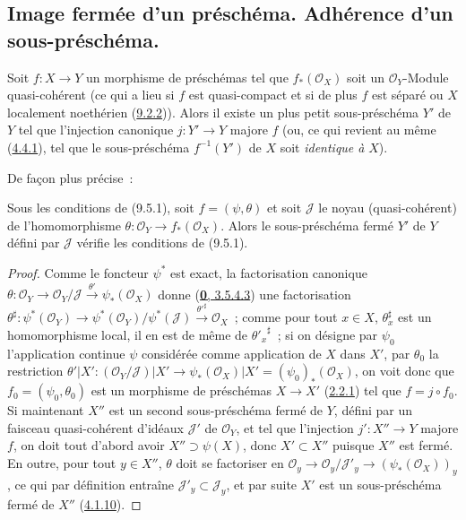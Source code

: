 \subsection{Image fermée d'un préschéma. Adhérence d'un sous-préschéma.}
\label{subsection:I.9.5-fr}

\begin{proposition}[9.5.1]
\label{I.9.5.1-fr}
Soit $f:X\to Y$ un morphisme de préschémas tel que $f_*(\mathscr{O}_X)$ soit
un $\mathscr{O}_Y$-Module quasi-cohérent (ce qui a lieu si $f$ est
quasi-compact et si de plus $f$ est séparé ou $X$ localement noethérien
(\hyperref[I.9.2.2-fr]{9.2.2})). Alors il existe un plus petit sous-préschéma
$Y'$ de $Y$ tel que l'injection canonique $j:Y'\to Y$ majore $f$ \textup{(ou, ce qui
revient au même (\hyperref[I.4.4.1-fr]{4.4.1}), tel que le sous-préschéma
$f^{-1}(Y')$ de $X$ soit \emph{identique à} $X$)}.
\end{proposition}

De façon plus précise~:

\begin{corollary}[9.5.2]
\label{I.9.5.2-fr}
Sous les conditions de (9.5.1), soit $f=(\psi,\theta)$ et soit $\mathscr{J}$
le noyau (quasi-cohérent) de l'homomorphisme
$\theta:\mathscr{O}_Y\to f_*(\mathscr{O}_X)$. Alors le sous-préschéma fermé
$Y'$ de $Y$ défini par $\mathscr{J}$ vérifie les conditions de (9.5.1).
\end{corollary}

\begin{proof}
Comme le foncteur $\psi^*$ est exact, la factorisation canonique
$\theta:\mathscr{O}_Y\to\mathscr{O}_Y/\mathscr{J}
\xrightarrow{\theta'}\psi_*(\mathscr{O}_X)$ donne
(\hyperref[0.3.5.4.3-fr]{\textbf{0}, 3.5.4.3}) une factorisation
$\theta^\sharp:\psi^*(\mathscr{O}_Y)
\to\psi^*(\mathscr{O}_Y)/\psi^*(\mathscr{J})
\xrightarrow{{\theta'}^\sharp}\mathscr{O}_X$~;
comme pour tout $x\in X$, $\theta_x^\sharp$ est un homomorphisme local, il
en est de même de ${\theta'_x}^\sharp$~; si on désigne par $\psi_0$
l'application continue $\psi$ considérée comme application de $X$ dans
$X'$, par $\theta_0$ la restriction
$\theta'|X':(\mathscr{O}_Y/\mathscr{J})|X'
\to\psi_*(\mathscr{O}_X)|X'=(\psi_0)_*(\mathscr{O}_X)$, on voit donc que
$f_0=(\psi_0,\theta_0)$ est un morphisme de préschémas $X\to X'$
(\hyperref[I.2.2.1-fr]{2.2.1}) tel que $f=j\circ f_0$. Si maintenant $X''$
est un second sous-préschéma fermé de $Y$, défini par un faisceau
quasi-cohérent d'idéaux $\mathscr{J}'$ de $\mathscr{O}_Y$, et tel que
l'injection $j':X''\to Y$ majore $f$, on doit tout d'abord avoir
$X''\supset\psi(X)$, donc $X'\subset X''$ puisque $X''$ est fermé. En outre,
pour tout $y\in X''$, $\theta$ doit se factoriser en
$\mathscr{O}_y\to\mathscr{O}_y/\mathscr{J}'_y
\to(\psi_*(\mathscr{O}_X))_y$, ce qui par définition entraîne
$\mathscr{J}'_y\subset\mathscr{J}_y$, et par suite $X'$ est un
sous-préschéma fermé de $X''$ (\hyperref[I.4.1.10-fr]{4.1.10}).
\end{proof}

